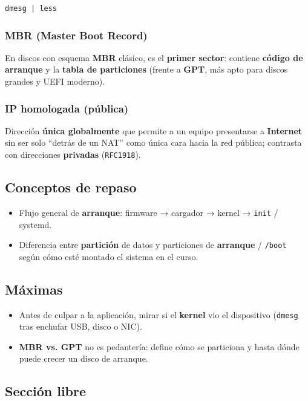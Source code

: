 \documentclass[11pt, letterpaper]{article}
\begin{document}
\begin{verbatim}
dmesg | less
\end{verbatim}
\subsubsection{MBR (Master Boot Record)}
\label{sec:orgb5bafb6}
En discos con esquema \textbf{MBR} clásico, es el \textbf{primer sector}: contiene \textbf{código de arranque} y la \textbf{tabla de particiones} (frente a \textbf{GPT}, más apto para discos grandes y UEFI moderno).
\subsubsection{IP homologada (pública)}
\label{sec:org1b711c7}
Dirección \textbf{única globalmente} que permite a un equipo presentarse a \textbf{Internet} sin ser solo “detrás de un NAT” como única cara hacia la red pública; contrasta con direcciones \textbf{privadas} (\texttt{RFC1918}).
\subsection{Conceptos de repaso}
\label{sec:org175cf36}

\begin{itemize}
\item Flujo general de \textbf{arranque}: firmware → cargador → kernel → \texttt{init} / systemd.
\item Diferencia entre \textbf{partición} de datos y particiones de \textbf{arranque} / \texttt{/boot} según cómo esté montado el sistema en el curso.
\end{itemize}
\subsection{Máximas}
\label{sec:org8ed0481}

\begin{itemize}
\item Antes de culpar a la aplicación, mirar si el \textbf{kernel} vio el dispositivo (\texttt{dmesg} tras enchufar USB, disco o NIC).
\item \textbf{MBR vs. GPT} no es pedantería: define cómo se particiona y hasta dónde puede crecer un disco de arranque.
\end{itemize}
\subsection{Sección libre}
\label{sec:orgb1a6dd6}
\end{document}
